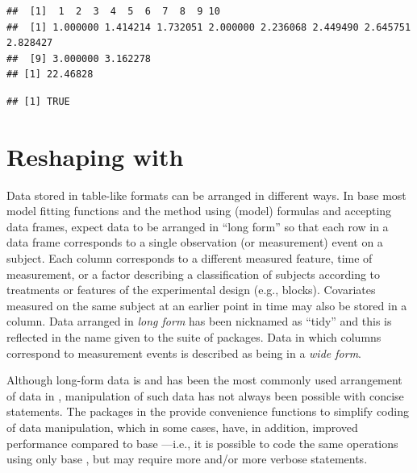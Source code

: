 \documentclass[krantz2]{krantz}\usepackage{knitr}
\begin{document}
\begin{knitrout}\footnotesize
{}\color{fgcolor}\begin{kframe}
\begin{alltt}
 \hlstd{() |>} \hlstd{() |>} \hlstd{() |>} \hlstd{() |>} \hlstd{()} \hlkwb{->} 
\end{alltt}
\begin{verbatim}
##  [1]  1  2  3  4  5  6  7  8  9 10
##  [1] 1.000000 1.414214 1.732051 2.000000 2.236068 2.449490 2.645751 2.828427
##  [9] 3.000000 3.162278
## [1] 22.46828
\end{verbatim}
\begin{alltt}
\end{alltt}
\begin{verbatim}
## [1] TRUE
\end{verbatim}
\end{kframe}
\end{knitrout}

\section{Reshaping with }
Data stored in table-like formats can be arranged in different ways. In base \Rlang most model fitting functions and the  method using (model) formulas and accepting data frames, expect data to be arranged in ``long form'' so that each row in a data frame corresponds to a single observation (or measurement) event on a subject. Each column corresponds to a different measured feature, time of measurement, or a factor describing a classification of subjects according to treatments or features of the experimental design (e.g., blocks). Covariates measured on the same subject at an earlier point in time may also be stored in a column. Data arranged in \emph{long form} has been nicknamed as ``tidy'' and this is reflected in the name given to the  suite of packages. Data in which columns correspond to measurement events is described as being in a \emph{wide form}.

Although long-form data is and has been the most commonly used arrangement of data in \Rlang, manipulation of such data has not always been possible with concise \Rlang statements. The packages in the  provide convenience functions to simplify coding of data manipulation, which in some cases, have, in addition, improved performance compared to base \Rlang---i.e., it is possible to code the same operations using only base \Rlang, but may require more and/or more verbose statements.
\end{document}
